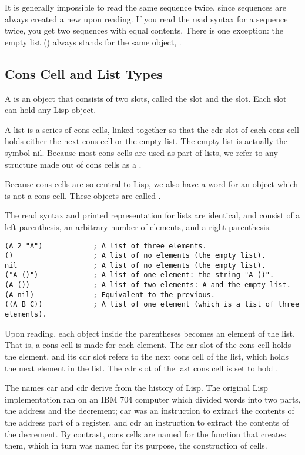 It is generally impossible to read the same sequence twice, since sequences are always created a new upon reading.
If you read the read syntax for a sequence twice, you get two sequences with equal contents.
There is one exception: the empty list () always stands for the same object, .


\subsection{Cons Cell and List Types}
\label{sec:cons-cell-list}

A  is an object that consists of two slots, called the  slot and the  slot.
Each slot can hold any Lisp object. 

A list is a series of cons cells, linked together so that the cdr slot of each cons cell holds either the next cons cell or the empty list.
The empty list is actually the symbol nil.
Because most cons cells are used as part of lists, we refer to any structure made out of cons cells as a .


Because cons cells are so central to Lisp, we also have a word for an object which is not a cons cell.
These objects are called .

The read syntax and printed representation for lists are identical, and consist of a left parenthesis, an arbitrary number of elements, and a right parenthesis.
\begin{lstlisting}
(A 2 "A")            ; A list of three elements.                      
()                   ; A list of no elements (the empty list).        
nil                  ; A list of no elements (the empty list).        
("A ()")             ; A list of one element: the string "A ()".      
(A ())               ; A list of two elements: A and the empty list.  
(A nil)              ; Equivalent to the previous.                    
((A B C))            ; A list of one element (which is a list of three elements).           
\end{lstlisting}

Upon reading, each object inside the parentheses becomes an element of the list.
That is, a cons cell is made for each element.
The car slot of the cons cell holds the element, and its cdr slot refers to the next cons cell of the list, which holds the next element in the list.
The cdr slot of the last cons cell is set to hold .


The names car and cdr derive from the history of Lisp.
The original Lisp implementation ran on an IBM 704 computer which divided words into two parts, the address and the decrement; car was an instruction to extract the contents of the address part of a register, and cdr an instruction to extract the contents of the decrement.
By contrast, cons cells are named for the function  that creates them, which in turn was named for its purpose, the construction of cells.




